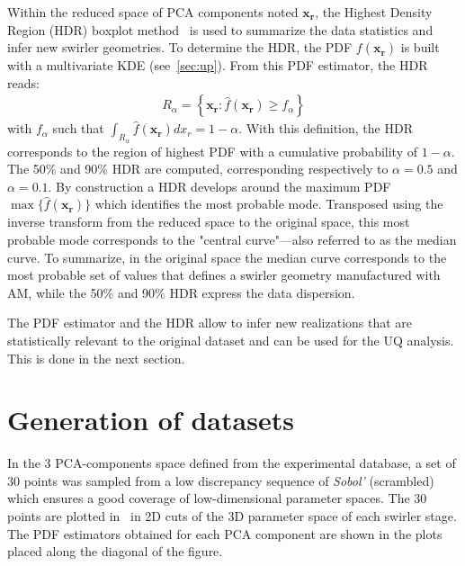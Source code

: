 Within the reduced space of PCA components noted $\mathbf{x_r}$, the Highest Density Region (HDR) boxplot method~\cite{Hyndman2009} is used to summarize the data statistics and infer new swirler geometries. To determine the HDR, the PDF $f(\mathbf{x_r})$ is built with a multivariate KDE (see~\cref{sec:up}). From this PDF estimator, the HDR reads:
\begin{align}
R_\alpha = \left\{ \mathbf{x_r}: \hat{f}(\mathbf{x_r}) \geq f_{\alpha} \right\}
\end{align}
\noindent with $f_{\alpha}$ such that $\int_{R_\alpha} \hat{f}(\mathbf{x_r}) d x_r = 1 - \alpha$. With this definition, the HDR corresponds to the region of highest PDF with a cumulative probability of $1-\alpha$. The 50\% and 90\% HDR are computed, corresponding respectively to $\alpha=0.5$ and $\alpha=0.1$. By construction  a HDR develops around the maximum PDF $\max \{\hat{f}(\mathbf{x_r})\}$ which identifies the most probable mode. Transposed using the inverse transform from the reduced space to the original space, this most probable mode corresponds to the "central curve"---also referred to as the median curve. To summarize, in the original space the median curve corresponds to the most probable set of values that defines a swirler geometry manufactured with AM, while the 50\% and 90\% HDR express the data dispersion.

The PDF estimator and the HDR allow to infer new realizations that are statistically relevant to the original dataset and can be used for the UQ analysis. This is done in the next section. 

\section{Generation of datasets }\label{sec:res}

In the 3 PCA-components space defined from the experimental database, a set of 30 points was sampled from a low discrepancy sequence of \emph{Sobol'} (scrambled)~\cite{Cavazzuti2013,Kucherenko2015} which ensures a good coverage of low-dimensional parameter spaces. The 30 points are plotted in ~in 2D cuts of the 3D parameter space of each swirler stage. The PDF estimators obtained for each PCA component are shown in the plots placed along the diagonal of the figure.  

